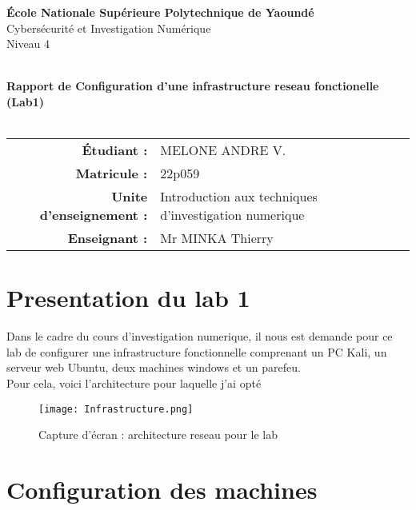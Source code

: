 \documentclass[11pt,a4paper]{report}
\newcommand{\school}{École Nationale Supérieure Polytechnique de Yaoundé}
\newcommand{\course}{Cybersécurité et Investigation Numérique}
\newcommand{\level}{Niveau 4}
\newcommand{\student}{MELONE ANDRE V.}
\newcommand{\matricule}{22p059}
\newcommand{\discipline}{Introduction aux techniques d'investigation numerique}
\newcommand{\teacher}{Mr MINKA Thierry}
\begin{document}
\begin{titlepage}
  \centering
  \vspace*{2cm}
  {\Huge\bfseries \school\\[0.5cm]}
  {\Large \course\\[0.5cm]}
  {\large \level\\[2cm]}

  \hrulefill\\[1cm]
  {\LARGE \textbf{Rapport de Configuration d'une infrastructure reseau fonctionelle (Lab1)}}\\[0.5cm]
  \hrulefill\\[2cm]

  \begin{tabular}{rl}
    \textbf{Étudiant :} & \student \\
    \textbf{Matricule :} & \matricule \\
    \textbf{Unite d'enseignement :} & \discipline \\
    \textbf{Enseignant :} & \teacher \\
    
  \end{tabular}

  \vfill
  
\end{titlepage}

\tableofcontents
\cleardoublepage

\chapter*{Presentation du lab 1}

Dans le cadre du cours d'investigation numerique, il nous est demande pour ce lab de configurer une infrastructure fonctionnelle comprenant un PC Kali, un serveur web Ubuntu, deux machines windows et un parefeu.\\

Pour cela, voici l'architecture pour laquelle j'ai opté

\begin{figure}[H]
\centering
\texttt{[image: Infrastructure.png]}
\caption{Capture d'écran : architecture reseau pour le lab}
\label{fig:Infrastructure}
\end{figure}


\chapter{Configuration des machines}
\label{ch:machines}
\end{document}
